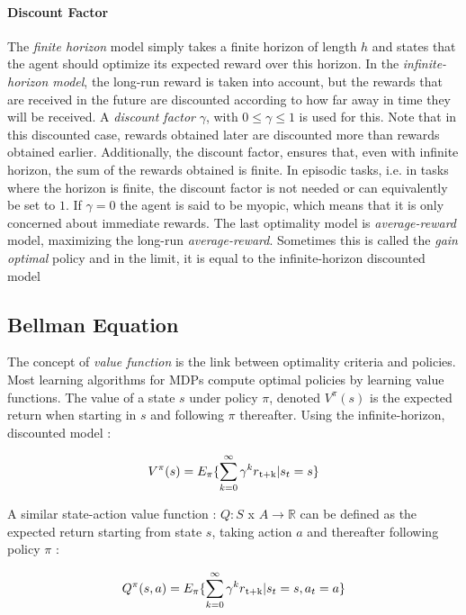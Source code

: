 \paragraph{Discount Factor}The \textit{finite horizon} model simply takes a finite horizon of length $h$ and states that the agent should optimize its expected reward over this horizon. In the \textit{infinite-horizon model}, the long-run reward is taken into account, but the rewards that are received in the future are discounted according to how far away in time they will be received.
A \textit{discount factor} $\gamma$, with $0 \leq \gamma \leq 1$ is used for this. Note that in this discounted case, rewards obtained later are discounted more than rewards obtained earlier. Additionally, the discount factor, ensures that, even with infinite horizon, the sum of the rewards obtained is finite. In episodic tasks, i.e. in tasks where the horizon is finite, the discount factor is not
needed or can equivalently be set to $1$. If $\gamma = 0$ the agent is said to be myopic, which means that it is only concerned about immediate rewards.
The last optimality model is \textit{average-reward} model, maximizing the long-run \textit{average-reward}. Sometimes this is called the \textit{gain optimal} policy and in the limit, it is equal to the infinite-horizon discounted model~\cite{wiering2012reinforcement}

\subsection {Bellman Equation} The concept of \textit{value function} is the link between optimality criteria and policies. Most learning algorithms for MDPs compute optimal policies by learning value functions. The value of a state $s$ under policy $\pi$, denoted $V^\pi (s)$ is the expected return when starting in $s$ and following $\pi$ thereafter. Using the infinite-horizon, discounted model :

\begin{equation}
	V^\pi (s) = E_\pi \{\sum_{k = 0}^{\infty} \gamma^k r\textsubscript{t+k} | s_t = s\}
\end{equation}

A similar state-action value function : $Q : S$ x $A \rightarrow \mathbb{R}$ can be defined as the expected return starting from state $s$, taking action $a$ and thereafter following policy $\pi$ :

\begin{equation} \label{eq:2.2}
	Q^\pi (s,a) = E_\pi\{\sum_{k = 0}^{\infty} \gamma^k r\textsubscript{t+k} | s_t = s, a_t = a\}
\end{equation}

